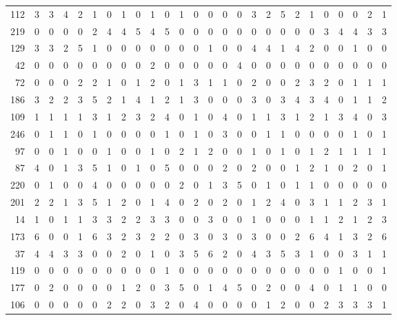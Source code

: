 \begin{longtable}{@{\extracolsep{\fill}}rccccccccccccccccccccccccc@{}}
112 & 3 & 3 & 4 & 2 & 1 & 0 & 1 & 0 & 1 & 0 & 1 & 0 & 0 & 0 & 0 & 3 & 2 & 5 & 2 & 1 & 0 & 0 & 0 & 2 & 1 \\
219 & 0 & 0 & 0 & 0 & 2 & 4 & 4 & 5 & 4 & 5 & 0 & 0 & 0 & 0 & 0 & 0 & 0 & 0 & 0 & 0 & 3 & 4 & 4 & 3 & 3 \\
129 & 3 & 3 & 2 & 5 & 1 & 0 & 0 & 0 & 0 & 0 & 0 & 0 & 1 & 0 & 0 & 4 & 4 & 1 & 4 & 2 & 0 & 0 & 1 & 0 & 0 \\
42 & 0 & 0 & 0 & 0 & 0 & 0 & 0 & 0 & 2 & 0 & 0 & 0 & 0 & 0 & 4 & 0 & 0 & 0 & 0 & 0 & 0 & 0 & 0 & 0 & 0 \\
72 & 0 & 0 & 0 & 2 & 2 & 1 & 0 & 1 & 2 & 0 & 1 & 3 & 1 & 1 & 0 & 2 & 0 & 0 & 2 & 3 & 2 & 0 & 1 & 1 & 1 \\
186 & 3 & 2 & 2 & 3 & 5 & 2 & 1 & 4 & 1 & 2 & 1 & 3 & 0 & 0 & 0 & 3 & 0 & 3 & 4 & 3 & 4 & 0 & 1 & 1 & 2 \\
109 & 1 & 1 & 1 & 1 & 3 & 1 & 2 & 3 & 2 & 4 & 0 & 1 & 0 & 4 & 0 & 1 & 1 & 3 & 1 & 2 & 1 & 3 & 4 & 0 & 3 \\
246 & 0 & 1 & 1 & 0 & 1 & 0 & 0 & 0 & 0 & 1 & 0 & 1 & 0 & 3 & 0 & 0 & 1 & 1 & 0 & 0 & 0 & 0 & 1 & 0 & 1 \\
97 & 0 & 0 & 1 & 0 & 0 & 1 & 0 & 0 & 1 & 0 & 2 & 1 & 2 & 0 & 0 & 1 & 0 & 1 & 0 & 1 & 2 & 1 & 1 & 1 & 1 \\
87 & 4 & 0 & 1 & 3 & 5 & 1 & 0 & 1 & 0 & 5 & 0 & 0 & 0 & 2 & 0 & 2 & 0 & 0 & 1 & 2 & 1 & 0 & 2 & 0 & 1 \\
220 & 0 & 1 & 0 & 0 & 4 & 0 & 0 & 0 & 0 & 0 & 2 & 0 & 1 & 3 & 5 & 0 & 1 & 0 & 1 & 1 & 0 & 0 & 0 & 0 & 0 \\
201 & 2 & 2 & 1 & 3 & 5 & 1 & 2 & 0 & 1 & 4 & 0 & 2 & 0 & 2 & 0 & 1 & 2 & 4 & 0 & 3 & 1 & 1 & 2 & 3 & 1 \\
14 & 1 & 0 & 1 & 1 & 3 & 3 & 2 & 2 & 3 & 3 & 0 & 0 & 3 & 0 & 0 & 1 & 0 & 0 & 0 & 1 & 1 & 2 & 1 & 2 & 3 \\
173 & 6 & 0 & 0 & 1 & 6 & 3 & 2 & 3 & 2 & 2 & 0 & 3 & 0 & 3 & 0 & 3 & 0 & 0 & 2 & 6 & 4 & 1 & 3 & 2 & 6 \\
37 & 4 & 4 & 3 & 3 & 0 & 0 & 2 & 0 & 1 & 0 & 3 & 5 & 6 & 2 & 0 & 4 & 3 & 5 & 3 & 1 & 0 & 0 & 3 & 1 & 1 \\
119 & 0 & 0 & 0 & 0 & 0 & 0 & 0 & 0 & 0 & 1 & 0 & 0 & 0 & 0 & 0 & 0 & 0 & 0 & 0 & 0 & 0 & 1 & 0 & 0 & 1 \\
177 & 0 & 2 & 0 & 0 & 0 & 0 & 1 & 2 & 0 & 3 & 5 & 0 & 1 & 4 & 5 & 0 & 2 & 0 & 0 & 4 & 0 & 1 & 1 & 0 & 0 \\
106 & 0 & 0 & 0 & 0 & 0 & 2 & 2 & 0 & 3 & 2 & 0 & 4 & 0 & 0 & 0 & 0 & 1 & 2 & 0 & 0 & 2 & 3 & 3 & 3 & 1 \\

\end{longtable}
